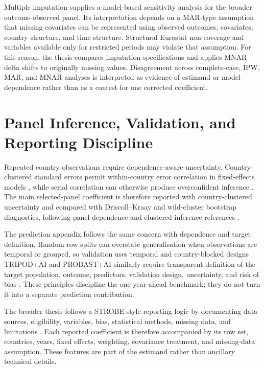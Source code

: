 Multiple imputation supplies a model-based sensitivity analysis for the broader outcome-observed panel. Its interpretation depends on a MAR-type assumption that missing covariates can be represented using observed outcomes, covariates, country structure, and time structure. Structural Eurostat non-coverage and variables available only for restricted periods may violate that assumption. For this reason, the thesis compares imputation specifications and applies MNAR delta shifts to originally missing values. Disagreement across complete-case, IPW, MAR, and MNAR analyses is interpreted as evidence of estimand or model dependence rather than as a contest for one corrected coefficient.

\section{Panel Inference, Validation, and Reporting Discipline}

Repeated country observations require dependence-aware uncertainty. Country-clustered standard errors permit within-country error correlation in fixed-effects models \citep{arellano_1987}, while serial correlation can otherwise produce overconfident inference \citep{bertrand_duflo_mullainathan_2004}. The main selected-panel coefficient is therefore reported with country-clustered uncertainty and compared with Driscoll--Kraay and wild-cluster bootstrap diagnostics, following panel-dependence and clustered-inference references \citep{driscoll_kraay_1998,cameron_gelbach_miller_2008}.

The prediction appendix follows the same concern with dependence and target definition. Random row splits can overstate generalisation when observations are temporal or grouped, so validation uses temporal and country-blocked designs \citep{roberts_2017_cross_validation}. TRIPOD+AI and PROBAST+AI similarly require transparent definition of the target population, outcome, predictors, validation design, uncertainty, and risk of bias \citep{collins_moons_dhiman_2024_tripod_ai,moons_damen_kaul_2025_probast_ai}. These principles discipline the one-year-ahead benchmark; they do not turn it into a separate prediction contribution.

The broader thesis follows a STROBE-style reporting logic by documenting data sources, eligibility, variables, bias, statistical methods, missing data, and limitations \citep{von_elm_altman_egger_2007_strobe}. Each reported coefficient is therefore accompanied by its row set, countries, years, fixed effects, weighting, covariance treatment, and missing-data assumption. These features are part of the estimand rather than ancillary technical details.

